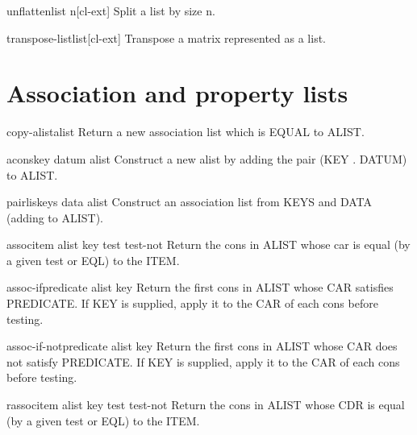\documentclass[10pt,english]{book}
\begin{document}
\begin{function}{unflatten}{list n}[cl-ext]
  Split a list by size n.
\end{function}

\begin{function}{transpose-list}{list}[cl-ext]
  Transpose a matrix represented as a list.
\end{function}

\section{Association and property lists}
\label{sec:association-lists}

\begin{function}{copy-alist}{alist}
  Return a new association list which is EQUAL to ALIST.
\end{function}

\begin{function}{acons}{key datum alist}
  Construct a new alist by adding the pair (KEY . DATUM) to ALIST.
\end{function}

\begin{function}{pairlis}{keys data \op alist}
  Construct an association list from KEYS and DATA (adding to ALIST).
\end{function}

\begin{function}{assoc}{item alist \key key test test-not}
  Return the cons in ALIST whose car is equal (by a given test or EQL) to
   the ITEM.
\end{function}

\begin{function}{assoc-if}{predicate alist \key key}
  Return the first cons in ALIST whose CAR satisfies PREDICATE. If
   KEY is supplied, apply it to the CAR of each cons before testing.
\end{function}

\begin{function}{assoc-if-not}{predicate alist \key key}
  Return the first cons in ALIST whose CAR does not satisfy PREDICATE.
  If KEY is supplied, apply it to the CAR of each cons before testing.
\end{function}

\begin{function}{rassoc}{item alist \key key test test-not}
  Return the cons in ALIST whose CDR is equal (by a given test or EQL) to
   the ITEM.
\end{function}
\end{document}
